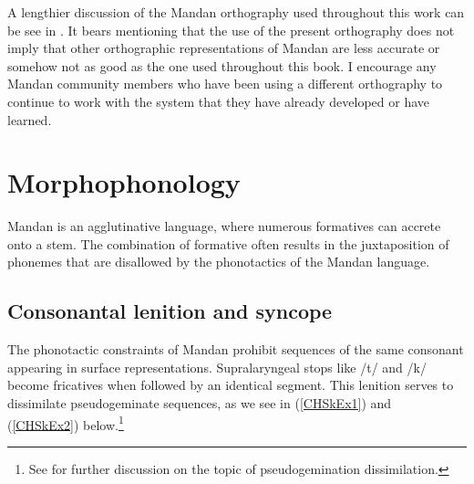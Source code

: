 A lengthier discussion of the Mandan orthography used throughout this work can be see in . It bears mentioning that the use of the present orthography does not imply that other orthographic representations of Mandan are less accurate or somehow not as good as the one used throughout this book. I encourage any Mandan community members who have been using a different orthography to continue to work with the system that they have already developed or have learned.

\section{Morphophonology}\label{CHSk2}

Mandan is an agglutinative language, where numerous formatives can accrete onto a stem. The combination of formative often results in the juxtaposition of phonemes that are disallowed by the phonotactics of the Mandan language.

\subsection{Consonantal lenition and syncope}\label{CHSk2.1}

The phonotactic constraints of Mandan prohibit sequences of the same consonant appearing in surface representations. Supralaryngeal stops like /t/ and /k/ become fricatives when followed by an identical segment. This lenition serves to dissimilate pseudogeminate sequences, as we see in (\ref{CHSkEx1}) and (\ref{CHSkEx2}) below.\footnote{See  for further discussion on the topic of pseudogemination dissimilation.}


